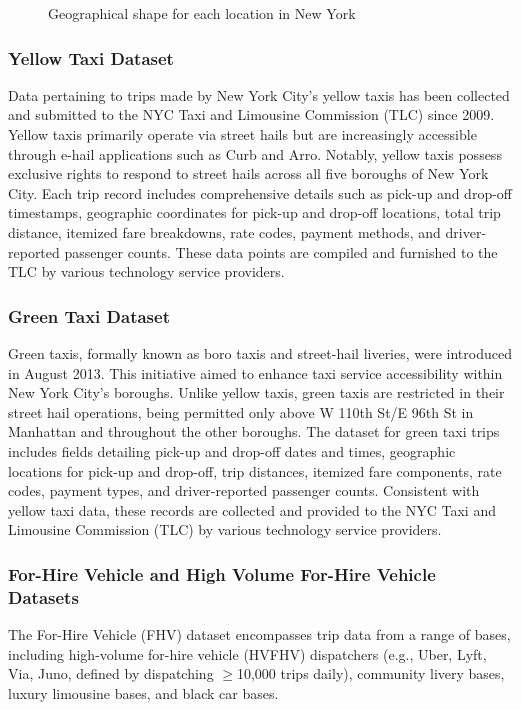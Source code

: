 \documentclass[conference]{IEEEtran}
\begin{document}
\begin{figure}[htbp]
  \label{fig:nyc-zones-map}
  \centering
  
  \caption{Geographical shape for each location in New York}
\end{figure}

\subsubsection*{Yellow Taxi Dataset}
Data pertaining to trips made by New York City's yellow taxis has been collected and submitted to the NYC Taxi and
Limousine Commission (TLC) since 2009. Yellow taxis primarily operate via street hails but are increasingly accessible
through e-hail applications such as Curb and Arro. Notably, yellow taxis possess exclusive rights to respond to street
hails across all five boroughs of New York City.
Each trip record includes comprehensive details such as pick-up and drop-off timestamps, geographic coordinates for
pick-up and drop-off locations, total trip distance, itemized fare breakdowns, rate codes, payment methods, and
driver-reported passenger counts. These data points are compiled and furnished to the TLC by various technology
service providers.

\subsubsection*{Green Taxi Dataset}
Green taxis, formally known as boro taxis and street-hail liveries, were introduced in August 2013. This initiative
aimed to enhance taxi service accessibility within New York City's boroughs. Unlike yellow taxis, green taxis are
restricted in their street hail operations, being permitted only above W 110th St/E 96th St in Manhattan and throughout
the other boroughs.
The dataset for green taxi trips includes fields detailing pick-up and drop-off dates and times, geographic locations
for pick-up and drop-off, trip distances, itemized fare components, rate codes, payment types, and driver-reported
passenger counts. Consistent with yellow taxi data, these records are collected and provided to the NYC Taxi and
Limousine Commission (TLC) by various technology service providers.

\subsubsection*{For-Hire Vehicle and High Volume For-Hire Vehicle Datasets} The For-Hire Vehicle (FHV) dataset
encompasses trip data from a range of bases, including high-volume for-hire vehicle (HVFHV) dispatchers (e.g., Uber,
Lyft, Via, Juno, defined by dispatching $\ge$10,000 trips daily), community livery bases, luxury limousine bases,
and black car bases.
\end{document}
